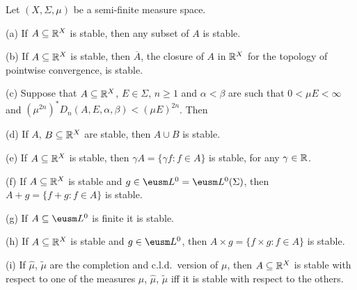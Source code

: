 
 Let $(X,\Sigma,\mu)$ be a semi-finite
measure space.

(a) If $A\subseteq\Bbb R^X$ is stable, then any subset of $A$ is stable.

(b) If $A\subseteq\Bbb R^X$ is stable, then $\overline{A}$, the closure
of $A$ in $\Bbb R^X$ for the topology of pointwise convergence, is
stable.

\ifdim\pagewidth>467pt\fontdimen3\tenrm=2pt\fi
\ifdim\pagewidth>467pt\fontdimen4\tenrm=1.67pt\fi
(c) Suppose that $A\subseteq\Bbb R^X$, $E\in\Sigma$, $n\ge 1$ and
$\alpha<\beta$ are such that $0<\mu E<\infty$ and
$(\mu^{2n})^*D_n(A,E,\alpha,\beta)<(\mu E)^{2n}$.   Then
\tenrm=1.67pt
\tenrm=1.11pt


(d) If $A$, $B\subseteq\Bbb R^X$ are stable, then $A\cup B$ is stable.

(e) If $A\subseteq\Bbb R^X$ is stable, then $\gamma A=\{\gamma f:f\in
A\}$ is stable, for any $\gamma\in\Bbb R$.

(f) If $A\subseteq\Bbb R^X$ is stable and
$g\in\eusm L^0=\eusm L^0(\Sigma)$, then
$A+g=\{f+g:f\in A\}$ is stable.

(g) If $A\subseteq\eusm L^0$ is finite it is stable.

(h) If $A\subseteq\Bbb R^X$ is stable and $g\in\eusm L^0$, then
$A\times g=\{f\times g:f\in A\}$ is stable.

(i) If $\hat\mu$, $\tilde\mu$ are the completion and c.l.d.\ version of
$\mu$, then $A\subseteq\Bbb R^X$ is stable with respect to one of the
measures $\mu$, $\hat\mu$, $\tilde\mu$ iff it is stable with respect to
the others.

